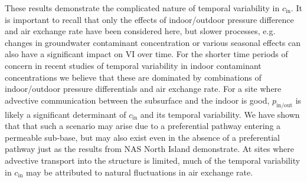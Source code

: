 These results demonstrate the complicated nature of temporal variability in $c_\mathrm{in}$.
It is important to recall that only the effects of indoor/outdoor pressure difference and air exchange rate have been considered here, but slower processes, e.g. changes in groundwater contaminant concentration or various seasonal effects can also have a significant impact on VI over time.
For the shorter time periods of concern in recent studies of temporal variability in indoor contaminant concentrations we believe that these are dominated by combinations of indoor/outdoor pressure differentials and air exchange rate.
For a site where advective communication between the subsurface and the indoor is good, $p_\mathrm{in/out}$ is likely a significant determinant of $c_\mathrm{in}$ and its temporal variability.
We have shown that that such a scenario may arise due to a preferential pathway entering a permeable sub-base, but may also exist even in the absence of a preferential pathway just as the results from NAS North Island demonstrate.
At sites where advective transport into the structure is limited, much of the temporal variability in $c_\mathrm{in}$ may be attributed to natural fluctuations in air exchange rate.\par
